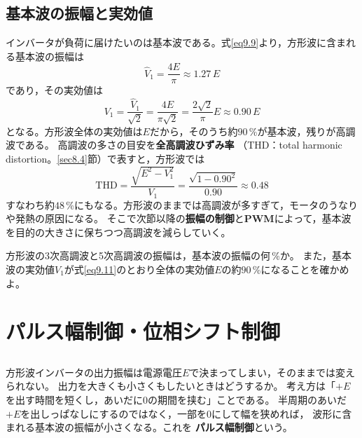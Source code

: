\subsection{基本波の振幅と実効値}

インバータが負荷に届けたいのは基本波である。式\ref{eq9.9}より，方形波に含まれる基本波の振幅は
\begin{equation}
\hat{V}_1 = \frac{4E}{\pi} \approx 1.27\,E
\label{eq9.10}
\end{equation}
であり，その実効値は
\begin{equation}
V_1 = \frac{\hat{V}_1}{\sqrt{2}} = \frac{4E}{\pi\sqrt{2}}
= \frac{2\sqrt{2}}{\pi}E \approx 0.90\,E
\label{eq9.11}
\end{equation}
となる。方形波全体の実効値は$E$だから，そのうち約$90$\,\%が基本波，残りが高調波である。
高調波の多さの目安を\textbf{全高調波ひずみ率}
（THD：total harmonic distortion。\ref{sec8.4}節）で表すと，方形波では
\begin{equation}
\mathrm{THD} = \frac{\sqrt{E^2 - V_1^{2}}}{V_1}
= \frac{\sqrt{1 - 0.90^2}}{0.90} \approx 0.48
\label{eq9.12}
\end{equation}
すなわち約$48$\,\%にもなる。方形波のままでは高調波が多すぎて，モータのうなりや発熱の原因になる。
そこで次節以降の\textbf{振幅の制御}と\textbf{PWM}によって，基本波を目的の大きさに保ちつつ高調波を減らしていく。

\begin{問}
\item 方形波の3次高調波と5次高調波の振幅は，基本波の振幅の何\,\%か。
また，基本波の実効値$V_1$が式\ref{eq9.11}のとおり全体の実効値$E$の約$90$\,\%になることを確かめよ。
\end{問}


\section{パルス幅制御・位相シフト制御}
\label{sec9.4}

\subsection{}

方形波インバータの出力振幅は電源電圧$E$で決まってしまい，そのままでは変えられない。
出力を大きくも小さくもしたいときはどうするか。
考え方は「$+E$を出す時間を短くし，あいだに$0$の期間を挟む」ことである。
半周期のあいだ$+E$を出しっぱなしにするのではなく，一部を$0$にして幅を狭めれば，
波形に含まれる基本波の振幅が小さくなる。これを
\textbf{パルス幅制御}という。

